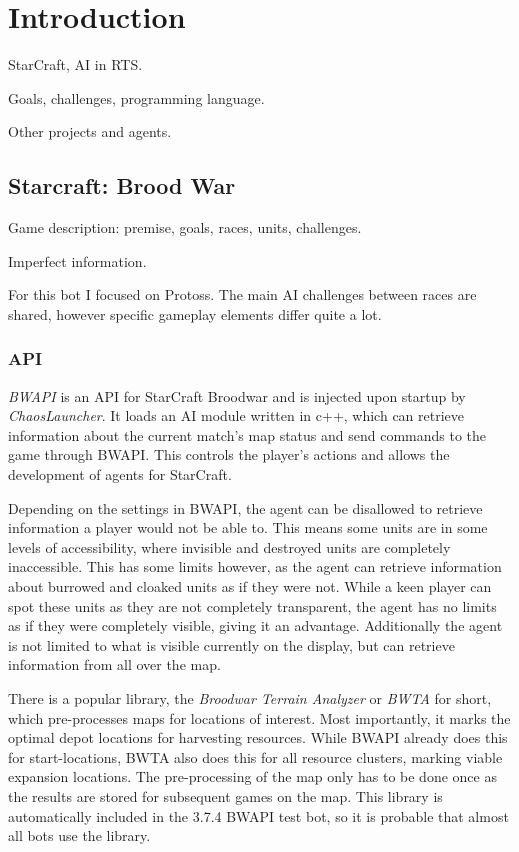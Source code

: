\chapter{Introduction}
StarCraft, AI in RTS.

Goals, challenges, programming language.

Other projects and agents.

\section{Starcraft: Brood War}
Game description: premise, goals, races, units, challenges.

Imperfect information.

For this bot I focused on Protoss. The main AI challenges between races are shared, however specific gameplay elements differ quite a lot.

	\subsection*{API}
	\emph{BWAPI} is an API for StarCraft Broodwar and is injected upon startup by \emph{ChaosLauncher}. It loads an AI module written in c++, which can retrieve information about the current match's map status and send commands to the game through BWAPI. This controls the player's actions and allows the development of agents for StarCraft.
	
	Depending on the settings in BWAPI, the agent can be disallowed to retrieve information a player would not be able to. This means some units are in some levels of accessibility, where invisible and destroyed units are completely inaccessible. This has some limits however, as the agent can retrieve information about burrowed and cloaked units as if they were not. While a keen player can spot these units as they are not completely transparent, the agent has no limits as if they were completely visible, giving it an advantage. Additionally the agent is not limited to what is visible currently on the display, but can retrieve information from all over the map.
	
	There is a popular library, the \emph{Broodwar Terrain Analyzer} or \emph{BWTA} for short, which pre-processes maps for locations of interest. Most importantly, it marks the optimal depot locations for harvesting resources. While BWAPI already does this for start-locations, BWTA also does this for all resource clusters, marking viable expansion locations. The pre-processing of the map only has to be done once as the results are stored for subsequent games on the map. This library is automatically included in the 3.7.4 BWAPI test bot, so it is probable that almost all bots use the library.
	
